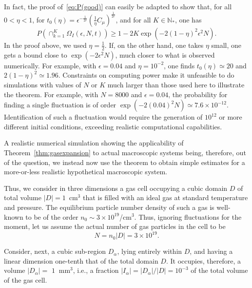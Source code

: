 \documentclass{article}
\newcommand {\N}{\mathbb{N}}
\numberwithin{equation}{section}
\begin{document}
In fact, the proof of~\eqref{eq:P(good)} can easily be adapted to show that, for all $0<\eta<1$, for $t_0(\eta)=\epsilon^{-\frac1{2r}}\left(\frac1{\eta}C_\mu\right)^{\frac1{2r}}$, and for all $K\in\N_*$, one has
\begin{equation}\label{eq:P(goodbis)}
P(\cap_{k=1}^{K}\Omega_I(\epsilon, N, t))\geq 1- 2K\exp(-2(1-\eta)^2\epsilon^2N).
\end{equation}
In the proof above, we used $\eta=\frac12$. If, on the other hand, one takes $\eta$ small, one gets a bound close to $\exp(-2\epsilon^2N)$, much closer to what is observed numerically. For example, with $\epsilon=0.04$ and $\eta=10^{-2}$, one finds $t_0(\eta)\simeq 20$ and $2(1-\eta)^2\simeq 1.96$. Constraints on computing power make it unfeasible to do simulations with values of $N$ or $K$ much larger than those used here to illustrate the theorem. For example, with $N=8 000$ and $\epsilon=0.04$, the probability for finding a single fluctuation is of order $\exp(-2(0.04)^2N)\simeq 7.6\times 10^{-12}$. Identification of such a fluctuation would require the generation of  $10^{12}$ or more different initial conditions, exceeding realistic computational capabilities.

A realistic numerical simulation showing the applicability of Theorem~\ref{thm:gasexpansion} to actual macroscopic systems being, therefore, out of the question, we instead now use the theorem to obtain simple estimates for a more-or-less realistic hypothetical macroscopic system.

Thus, we consider in three dimensions a gas cell occupying a cubic domain $D$ of total volume $|D| =1$~cm$^{3}$
that is filled with an ideal gas at standard temperature and pressure. The equilibrium particle number density of
such a gas is well-known to be of the order $n_{0}\sim 3\times 10^{19}$/cm$^{3}$.
Thus, ignoring fluctuations for the moment, let us assume the actual number of gas particles
in the cell to be
\begin{equation*}
N=n_{0}\left\vert D \right\vert =3\times 10^{19}.
\end{equation*}

Consider, next, a cubic sub-region $D _{\alpha }$, lying entirely within $D$,
and having a linear dimension one-tenth that of the total domain $D$.
It occupies, therefore, a volume $\left\vert D _{\alpha }\right\vert =$ $1~$%
mm$^{3}$, i.e., a fraction $\left\vert I_{\alpha
}\right\vert =\left\vert D _{\alpha }\right\vert /\left\vert D
\right\vert =10^{-3}$ of the total volume of the gas cell.
\end{document}
